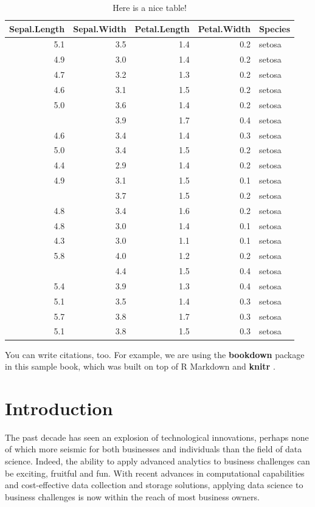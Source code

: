 \documentclass[
]{book}
\begin{document}
\begin{table}

\caption{\label{tab:nice-tab}Here is a nice table!}
\centering
\begin{tabular}[t]{rrrrl}
\toprule
Sepal.Length & Sepal.Width & Petal.Length & Petal.Width & Species\\
\midrule
5.1 & 3.5 & 1.4 & 0.2 & setosa\\
4.9 & 3.0 & 1.4 & 0.2 & setosa\\
4.7 & 3.2 & 1.3 & 0.2 & setosa\\
4.6 & 3.1 & 1.5 & 0.2 & setosa\\
5.0 & 3.6 & 1.4 & 0.2 & setosa\\
\addlinespace
5.4 & 3.9 & 1.7 & 0.4 & setosa\\
4.6 & 3.4 & 1.4 & 0.3 & setosa\\
5.0 & 3.4 & 1.5 & 0.2 & setosa\\
4.4 & 2.9 & 1.4 & 0.2 & setosa\\
4.9 & 3.1 & 1.5 & 0.1 & setosa\\
\addlinespace
5.4 & 3.7 & 1.5 & 0.2 & setosa\\
4.8 & 3.4 & 1.6 & 0.2 & setosa\\
4.8 & 3.0 & 1.4 & 0.1 & setosa\\
4.3 & 3.0 & 1.1 & 0.1 & setosa\\
5.8 & 4.0 & 1.2 & 0.2 & setosa\\
\addlinespace
5.7 & 4.4 & 1.5 & 0.4 & setosa\\
5.4 & 3.9 & 1.3 & 0.4 & setosa\\
5.1 & 3.5 & 1.4 & 0.3 & setosa\\
5.7 & 3.8 & 1.7 & 0.3 & setosa\\
5.1 & 3.8 & 1.5 & 0.3 & setosa\\
\bottomrule
\end{tabular}
\end{table}

You can write citations, too. For example, we are using the \textbf{bookdown} package \citep{R-bookdown} in this sample book, which was built on top of R Markdown and \textbf{knitr} \citep{xie2015}.

\hypertarget{introduction}{%
\chapter{Introduction}\label{introduction}}

The past decade has seen an explosion of technological innovations, perhaps none of which more seismic for both businesses and individuals than the field of data science. Indeed, the ability to apply advanced analytics to business challenges can be exciting, fruitful and fun. With recent advances in computational capabilities and cost-effective data collection and storage solutions, applying data science to business challenges is now within the reach of most business owners.
\end{document}
